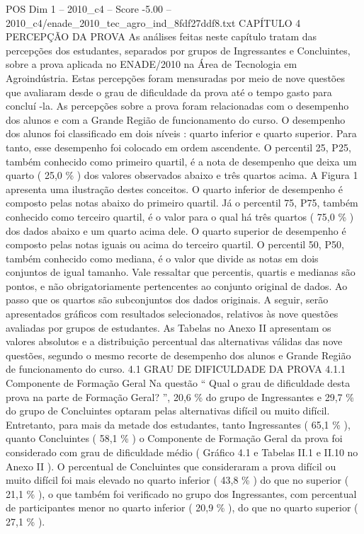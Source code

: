 \begin{textsample}{POS Dim 1 – 2010\_c4 – Score -5.00 – 2010\_c4/enade\_2010\_tec\_agro\_ind\_8fdf27ddf8.txt}  \label{ex:f1_pos_401}
CAPÍTULO 4 PERCEPÇÃO DA PROVA As análises feitas neste capítulo tratam das percepções dos estudantes, separados por grupos de Ingressantes e Concluintes, sobre a prova aplicada no ENADE/2010 na Área de Tecnologia em Agroindústria.
Estas percepções foram mensuradas por meio de nove questões que avaliaram desde o grau de dificuldade da prova até o tempo gasto para concluí -la.
As percepções sobre a prova foram relacionadas com o desempenho dos alunos e com a Grande Região de funcionamento do curso.
O desempenho dos alunos foi classificado em dois níveis : quarto inferior e quarto superior.
Para tanto, esse desempenho foi colocado em ordem ascendente.
O percentil 25, P25, também conhecido como primeiro quartil, é a nota de desempenho que deixa um quarto ( 25,0 \% ) dos valores observados abaixo e três quartos acima.
A Figura 1 apresenta uma ilustração destes conceitos.
O quarto inferior de desempenho é composto pelas notas abaixo do primeiro quartil.
Já o percentil 75, P75, também conhecido como terceiro quartil, é o valor para o qual há três quartos ( 75,0 \% ) dos dados abaixo e um quarto acima dele.
O quarto superior de desempenho é composto pelas notas iguais ou acima do terceiro quartil.
O percentil 50, P50, também conhecido como mediana, é o valor que divide as notas em dois conjuntos de igual tamanho.
Vale ressaltar que percentis, quartis e medianas são pontos, e não obrigatoriamente pertencentes ao conjunto original de dados.
Ao passo que os quartos são subconjuntos dos dados originais.
A seguir, serão apresentados gráficos com resultados selecionados, relativos às nove questões avaliadas por grupos de estudantes.
As Tabelas no Anexo II apresentam os valores absolutos e a distribuição percentual das alternativas válidas das nove questões, segundo o mesmo recorte de desempenho dos alunos e Grande Região de funcionamento do curso. 4.1 GRAU DE DIFICULDADE DA PROVA 4.1.1 Componente de Formação Geral Na questão “ Qual o grau de dificuldade desta prova na parte de Formação Geral? ”, 20,6 \% do grupo de Ingressantes e 29,7 \% do grupo de Concluintes optaram pelas alternativas difícil ou muito difícil.
Entretanto, para mais da metade dos estudantes, tanto Ingressantes ( 65,1 \% ), quanto Concluintes ( 58,1 \% ) o Componente de Formação Geral da prova foi considerado com grau de dificuldade médio ( Gráfico 4.1 e Tabelas II.1 e II.10 no Anexo II ).
O percentual de Concluintes que consideraram a prova difícil ou muito difícil foi mais elevado no quarto inferior ( 43,8 \% ) do que no superior ( 21,1 \% ), o que também foi verificado no grupo dos Ingressantes, com percentual de participantes menor no quarto inferior ( 20,9 \% ), do que no quarto superior ( 27,1 \% ).

\end{textsample}
